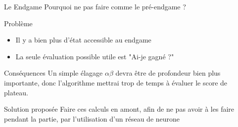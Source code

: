 \documentclass{beamer}
\begin{document}
\begin{frame}{Le Endgame}
    Pourquoi ne pas faire comme le pré-endgame ?
    \begin{block}{Problème}
    \begin{itemize}
        \item Il y a bien plus d'état accessible au endgame
        \item La seule évaluation possible utile est "Ai-je gagné ?"
    \end{itemize}
    \end{block}
    \begin{block}{Conséquences}
        Un simple élagage $\alpha\beta$ devra être de profondeur bien plus importante, donc l'algorithme mettrai trop de temps à évaluer le score de plateau.
    \end{block}
    \begin{block}{Solution proposée}
        Faire ces calculs en amont, afin de ne pas avoir à les faire pendant la partie, par l'utilisation d'un réseau de neurone
    \end{block}
\end{frame}
\end{document}
